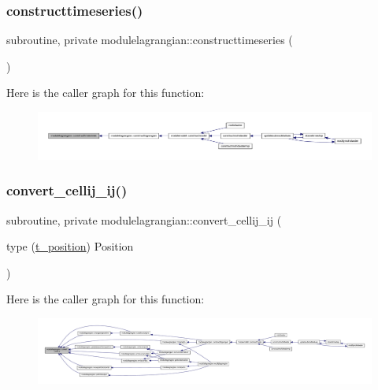 \subsubsection{\texorpdfstring{constructtimeseries()}{constructtimeseries()}}
{\footnotesize\ttfamily subroutine, private modulelagrangian\+::constructtimeseries (\begin{DoxyParamCaption}{ }\end{DoxyParamCaption})\hspace{0.3cm}{\ttfamily [private]}}

Here is the caller graph for this function\+:\nopagebreak
\begin{figure}[H]
\begin{center}
\leavevmode
\includegraphics[width=350pt]{namespacemodulelagrangian_a00248d924be257777ce6bdce98029594_icgraph}
\end{center}
\end{figure}
\mbox{\label{namespacemodulelagrangian_acf4d2d03d6e5a08dbd6f22a256ca3d91}} 
\subsubsection{\texorpdfstring{convert\+\_\+cellij\+\_\+ij()}{convert\_cellij\_ij()}}
{\footnotesize\ttfamily subroutine, private modulelagrangian\+::convert\+\_\+cellij\+\_\+ij (\begin{DoxyParamCaption}\item[{type (\mbox{\hyperlink{structmodulelagrangian_1_1t__position}{t\+\_\+position}})}]{Position }\end{DoxyParamCaption})\hspace{0.3cm}{\ttfamily [private]}}

Here is the caller graph for this function\+:\nopagebreak
\begin{figure}[H]
\begin{center}
\leavevmode
\includegraphics[width=350pt]{namespacemodulelagrangian_acf4d2d03d6e5a08dbd6f22a256ca3d91_icgraph}
\end{center}
\end{figure}
\mbox{\label{namespacemodulelagrangian_afc4e34e45162b06f3c0a80ae1e000fe8}} 
